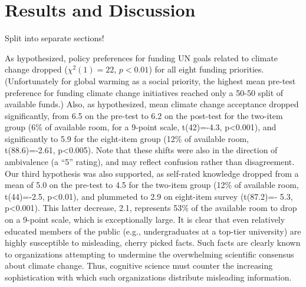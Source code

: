 \section{Results and Discussion}

Split into separate sections!

As hypothesized, policy preferences for funding UN goals
related to climate change dropped ($\chi^2(1)=22$, $p<0.01$) for all eight funding
priorities. (Unfortunately for global warming as a social priority, the highest
mean pre-test preference for funding climate change initiatives reached only a
50-50 split of available funds.) Also, as hypothesized, mean climate change
acceptance dropped significantly, from 6.5 on the pre-test to 6.2 on the
post-test for the two-item group (6\% of available room, for a 9-point scale,
t(42)=-4.3, p<0.001), and significantly to 5.9 for the eight-item group (12\% of
available room, t(88.6)=‑2.61, p<0.005). Note that these shifts were also in the
direction of ambivalence (a ``5'' rating), and may reflect confusion rather than
disagreement. Our third hypothesis was also supported, as self-rated knowledge
dropped from a mean of 5.0 on the pre-test to 4.5 for the two-item group (12\% of
available room, t(44)=-2.5, p<0.01), and plummeted to 2.9 on eight-item survey
(t(87.2)=- 5.3, p<0.001). This latter decrease, 2.1, represents 53\% of the
available room to drop on a 9-point scale, which is exceptionally large.  It is
clear that even relatively educated members of the public (e.g., undergraduates
at a top-tier university) are highly susceptible to misleading, cherry picked
facts. Such facts are clearly known to organizations attempting to undermine the
overwhelming scientific consensus about climate change. Thus, cognitive science
must counter the increasing sophistication with which such organizations
distribute misleading information.

